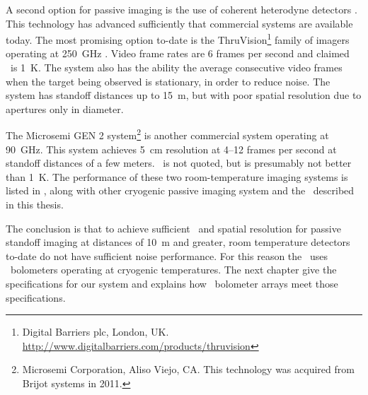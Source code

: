 A second option for passive imaging is the use of coherent heterodyne detectors \cite{rieke_detection_2003,rogalski_terahertz_2011}.
This technology has advanced sufficiently that commercial systems are available today.
The most promising option to-date is the ThruVision\footnote{Digital Barriers plc, London, UK. \url{http://www.digitalbarriers.com/products/thruvision}} family of imagers operating at \SI{250}{\GHz} \cite{mann_first_2009,digital_barriers_extra_????}.
Video frame rates are 6 frames per second and claimed \NETD\ is \SI{1}{\K}.
The system also has the ability the average consecutive video frames when the target being observed is stationary, in order to reduce noise.
The system has standoff distances up to \SI{15}{\m}, but with poor spatial resolution due to apertures only  in diameter.

The Microsemi GEN 2 system\footnote{%
Microsemi Corporation, Aliso Viejo, CA. This technology was acquired from Brijot systems in 2011.}
is another commercial system operating at \SI{90}{\GHz}.
This system achieves \SI{5}{\cm} resolution at 4--12 frames per second at standoff distances of a few meters.
\NETD\ is not quoted, but is presumably not better than \SI{1}{\K}.
The performance of these two room-temperature imaging systems is listed in , along with other cryogenic passive imaging system and the \Imager\ described in this thesis.

The conclusion is that to achieve sufficient \NETD\ and spatial resolution for passive standoff imaging at distances of \SI{10}{\m} and greater, room temperature detectors to-date do not have sufficient noise performance.
For this reason the \Imager\ uses \TES\ bolometers operating at cryogenic temperatures.
The next chapter give the specifications for our system and explains how \TES\ bolometer arrays meet those specifications.
